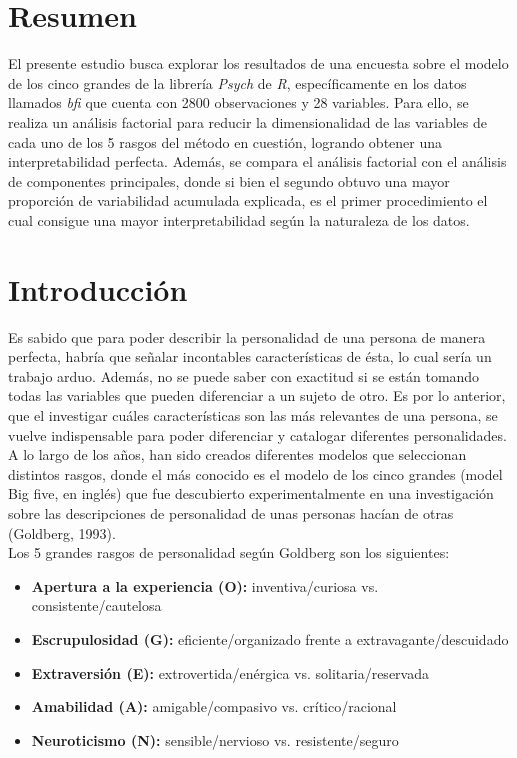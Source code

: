 \documentclass{report}
\begin{document}


\tableofcontents
\chapter{Resumen}
El presente estudio busca explorar los resultados de una encuesta sobre el modelo de los cinco grandes de la librería \textit{Psych} de \textit{R}, específicamente en los datos llamados \textit{bfi} que cuenta con 2800 observaciones y 28 variables. Para ello, se realiza un análisis factorial para reducir la dimensionalidad de las variables de cada uno de los 5 rasgos del método en cuestión, logrando obtener una interpretabilidad perfecta. Además, se compara el análisis factorial con el análisis de componentes principales, donde si bien el segundo obtuvo una mayor proporción de variabilidad acumulada explicada, es el primer procedimiento el cual consigue una mayor interpretabilidad según la naturaleza de los datos.
\chapter{Introducción}\label{intro}

Es sabido que para poder describir la personalidad de una persona de manera perfecta, habría que señalar incontables características de ésta, lo cual sería un trabajo arduo. Además, no se puede saber con exactitud si se están tomando todas las variables que pueden diferenciar a un sujeto de otro. Es por lo anterior, que el investigar cuáles características son las más relevantes de una persona, se vuelve indispensable para poder diferenciar y catalogar diferentes personalidades.\\

A lo largo de los años, han sido creados diferentes modelos que seleccionan distintos rasgos, donde el más conocido es el modelo de los cinco grandes (model Big five, en inglés) que fue descubierto experimentalmente en una investigación sobre las descripciones de personalidad de unas personas hacían de otras (Goldberg, 1993).\\

Los 5 grandes rasgos de personalidad según Goldberg son los siguientes:\\

\begin{itemize}
    \item \textbf{Apertura a la experiencia (O):} inventiva/curiosa vs. consistente/cautelosa\\
\item \textbf{Escrupulosidad (G):} eficiente/organizado frente a extravagante/descuidado
\item \textbf{Extraversión (E):} extrovertida/enérgica vs. solitaria/reservada
    \item  \textbf{Amabilidad (A):} amigable/compasivo vs. crítico/racional
\item \textbf{Neuroticismo (N):} sensible/nervioso vs. resistente/seguro
\end{itemize}\\
\end{document}
